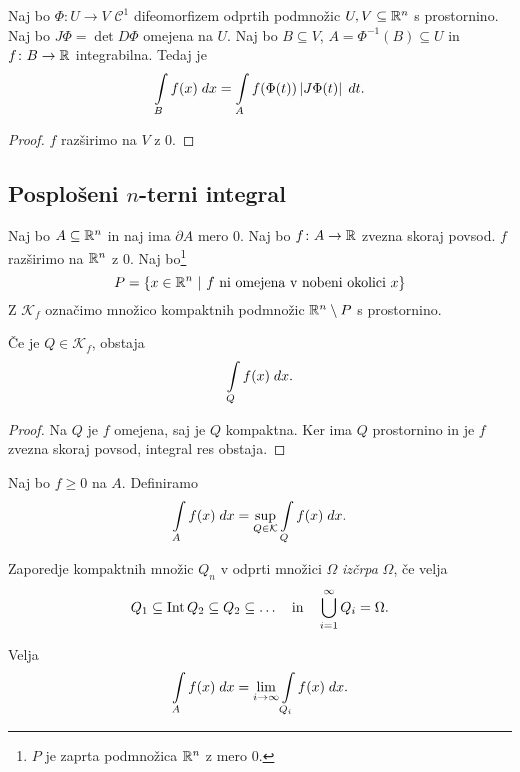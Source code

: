 \begin{posledica}
Naj bo $\Phi \colon U \to V$ $\mathcal{C}^1$ difeomorfizem odprtih
podmnožic $U, V \subseteq \mathbb{R}^n$ s prostornino. Naj bo
$J \Phi = \det D\Phi$ omejena na $U$. Naj bo $B \subseteq V$,
$A = \Phi^{-1}(B) \subseteq U$ in $f \colon B \to \mathbb{R}$ integrabilna.
Tedaj je
\[
\int\limits_B f(x)\;dx = \int\limits_A f(\Phi(t)) \left\lvert J\Phi(t)\right\rvert\;dt.
\]
\end{posledica}

\begin{proof}
$f$ razširimo na $V$ z $0$.
\end{proof}

\newpage

\subsection{Posplošeni $n$-terni integral}

\begin{definicija}
Naj bo $A \subseteq \mathbb{R}^n$ in naj ima $\partial A$ mero $0$. Naj bo
$f \colon A \to \mathbb{R}$ zvezna skoraj povsod. $f$ razširimo na $\mathbb{R}^n$ z
$0$. Naj bo\footnote{$P$ je zaprta podmnožica $\mathbb{R}^n$ z mero $0$.}
\[
P = \left\{x \in \mathbb{R}^n~\middle\vert~\text{$f$ ni omejena v nobeni okolici $x$}\right\}
\]
Z $\mathcal{K}_f$ označimo množico kompaktnih podmnožic
$\mathbb{R}^n \setminus P$ s prostornino.
\end{definicija}

\begin{trditev}
Če je $Q \in \mathcal{K}_f$, obstaja
\[
\int\limits_Q f(x)\;dx.
\]
\end{trditev}

\begin{proof}
Na $Q$ je $f$ omejena, saj je $Q$ kompaktna. Ker ima $Q$
prostornino in je $f$ zvezna skoraj povsod, integral res obstaja.
\end{proof}

\begin{definicija}
Naj bo $f \geq 0$ na $A$. Definiramo
\[
\int\limits_A f(x)\;dx = \sup_{Q \in \mathcal{K}} \int\limits_Q f(x)\;dx.
\]
\end{definicija}

\begin{definicija}
Zaporedje kompaktnih množic $Q_n$ v odprti množici $\Omega$
\emph{izčrpa} $\Omega$, če velja
\[
Q_1 \subseteq \operatorname{Int} Q_2 \subseteq Q_2 \subseteq \dots
\quad \text{in} \quad
\bigcup_{i=1}^\infty Q_i = \Omega.
\]
\end{definicija}

\begin{trditev}
Velja
\[
\int\limits_A f(x)\;dx =
\lim_{i \to \infty} \int\limits_{Q_i} f(x)\;dx.
\]
\end{trditev}

